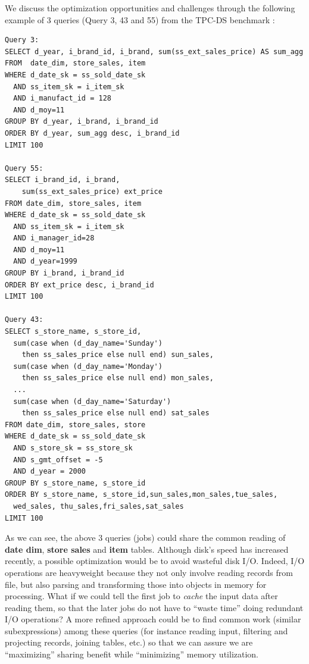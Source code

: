 We discuss the optimization opportunities and challenges through the following example of 3 queries (Query 3, 43 and 55) from the TPC-DS benchmark \cite{tpcds}:
\begingroup
\fontsize{6pt}{7pt}
\selectfont
\begin{verbatim}
Query 3:
SELECT d_year, i_brand_id, i_brand, sum(ss_ext_sales_price) AS sum_agg
FROM  date_dim, store_sales, item
WHERE d_date_sk = ss_sold_date_sk
  AND ss_item_sk = i_item_sk
  AND i_manufact_id = 128
  AND d_moy=11
GROUP BY d_year, i_brand, i_brand_id
ORDER BY d_year, sum_agg desc, i_brand_id
LIMIT 100

Query 55:
SELECT i_brand_id, i_brand, 
	sum(ss_ext_sales_price) ext_price
FROM date_dim, store_sales, item
WHERE d_date_sk = ss_sold_date_sk
  AND ss_item_sk = i_item_sk
  AND i_manager_id=28
  AND d_moy=11
  AND d_year=1999
GROUP BY i_brand, i_brand_id
ORDER BY ext_price desc, i_brand_id
LIMIT 100

Query 43:
SELECT s_store_name, s_store_id, 
  sum(case when (d_day_name='Sunday') 
    then ss_sales_price else null end) sun_sales,
  sum(case when (d_day_name='Monday') 
    then ss_sales_price else null end) mon_sales,
  ...
  sum(case when (d_day_name='Saturday') 
    then ss_sales_price else null end) sat_sales
FROM date_dim, store_sales, store
WHERE d_date_sk = ss_sold_date_sk 
  AND s_store_sk = ss_store_sk
  AND s_gmt_offset = -5
  AND d_year = 2000
GROUP BY s_store_name, s_store_id
ORDER BY s_store_name, s_store_id,sun_sales,mon_sales,tue_sales,
  wed_sales, thu_sales,fri_sales,sat_sales
LIMIT 100
\end{verbatim}
\endgroup

As we can see, the above 3 queries (jobs) could share the common reading of \textbf{date dim}, \textbf{store sales} and \textbf{item} tables. Although disk's speed has increased recently, a possible optimization would be to avoid wasteful disk I/O. Indeed, I/O operations are heavyweight because they not only involve reading records from file, but also parsing and transforming those into objects in memory for processing. What if we could tell the first job to \emph{cache} the input data after reading them, so that the later jobs do not have to ``waste time'' doing redundant I/O operations? A more refined approach could be to find common work (similar subexpressions) among these queries (for instance reading input, filtering and projecting records, joining tables, etc.) so that we can assure we are ``maximizing'' sharing benefit while ``minimizing'' memory utilization.

